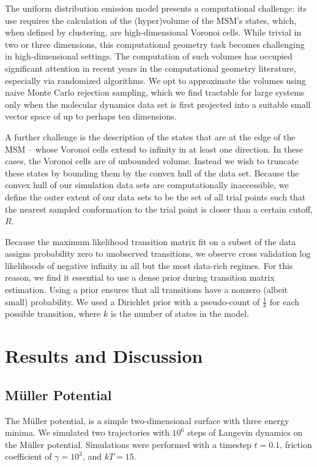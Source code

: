 \documentclass[journal=jpcbfk, layout=traditional, manuscript=article]{achemso}
\begin{document}
The uniform distribution emission model presents a computational challenge: its use requires the calculation of the (hyper)volume of the MSM's states, which, when defined by clustering, are high-dimensional Voronoi cells. While trivial in two or three dimensions, this computational geometry task becomes challenging in high-dimensional settings. The computation of such volumes has occupied significant attention in recent years in the computational geometry literature, especially via randomized algorithms\cite{Kannan97, Simonovits03, Lovasz03}. We opt to approximate the volumes using naive Monte Carlo rejection sampling, which we find tractable for large systems only when the molecular dynamics data set is first projected into a suitable small vector space of up to perhaps ten dimensions.

A further challenge is the description of the states that are at the edge of the MSM -- whose Voronoi cells extend to infinity in at least one direction. In these cases, the Voronoi cells are of unbounded volume. Instead we wish to truncate these states by bounding them by the convex hull of the data set. Because the convex hull of our simulation data sets are computationally inaccessible, we define the outer extent of our data sets to be the set of all trial points such that the nearest sampled conformation to the trial point is closer than a certain cutoff, $R$.

Because the maximum likelihood transition matrix fit on a subset of the data assigns probability zero to unobserved transitions, we observe cross validation log likelihoods of negative infinity in all but the most data-rich regimes. For this reason, we find it essential to use a dense prior during transition matrix estimation. Using a prior ensures that all transitions have a nonzero (albeit small) probability. We used a Dirichlet prior with a pseudo-count of $\frac{1}{k}$ for each possible transition, where $k$ is the number of states in the model\cite{msmb2?, nina?, wherever this happens to be}. 

\section{Results and Discussion}
\subsection{M\"{u}ller Potential}
The M\"{u}ller potential, is a simple two-dimensional surface with three energy minima. We simulated two trajectories with $10^6$ steps of Langevin dynamics on the M\"{u}ller potential\cite{Muller1980Reaction}. Simulations were performed with a timestep $t=0.1$, friction coefficient of $\gamma=10^3$, and $kT=15$. 
\end{document}
